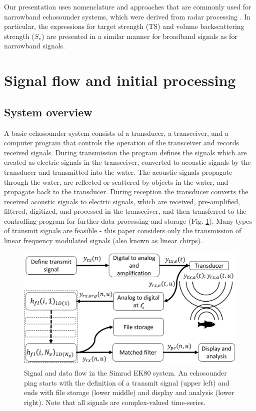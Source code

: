 \documentclass[preprint,12pt,TurnOnLineNumbers]{JASAnew}
\newcommand{\ek}{Simrad EK80}
\newcommand{\ts}{\textrm{TS}}
\newcommand{\sv}{S_{\textrm{v}}}
\begin{document}
Our presentation uses nomenclature and approaches that are commonly used for narrowband echosounder systems, which were derived from radar processing \citep{cook1967}. In particular, the expressions for target strength ($\ts$) and volume backscattering strength ($\sv$) \citep{MacLennan2002consistent} are presented in a similar manner for broadband signals as for narrowband signals.

\section{Signal flow and initial processing}

\subsection{System overview}
A basic echosounder system consists of a transducer, a transceiver, and a computer program that controls the operation of the transceiver and records received signals. During transmission the program defines the signals which are created as electric signals in the transceiver, converted to acoustic signals by the transducer and transmitted into the water. The acoustic signals propagate through the water, are reflected or scattered by objects in the water, and propagate back to the transducer. During reception the transducer converts the received acoustic signals to electric signals, which are received, pre-amplified, filtered, digitized, and processed in the transceiver, and then transferred to the controlling program for further data processing and storage (Fig. \ref{fi:ek_sys}). Many types of transmit signals are feasible - this paper considers only the transmission of linear frequency modulated signals (also known as linear chirps).

\begin{figure}
\includegraphics[width=16cm]{Fig_ek_sys}
\caption{\label{fi:ek_sys}Signal and data flow in the \ek{} system. An echosounder ping starts with the definition of a transmit signal (upper left) and ends with file storage (lower middle) and display and analysis (lower right). Note that all signals are complex-valued time-series.}
\end{figure}
\end{document}
